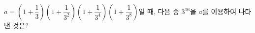 $a=\left(1+\dfrac{1}{3}\right)\left(1+\dfrac{1}{3^2}\right)\left(1+\dfrac{1}{3^4}\right)\left(1+\dfrac{1}{3^8}\right)$일 때, 다음 중 $3^{16}$을 $a$를 이용하여 나타낸 것은?
